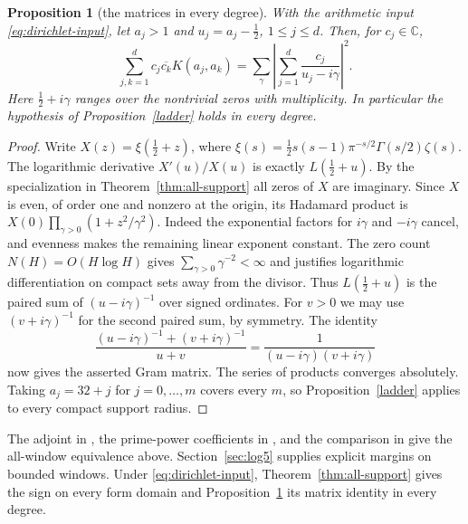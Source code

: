 \documentclass[11pt]{amsart}
\newtheorem{proposition}[theorem]{Proposition}
\theoremstyle{definition}
\theoremstyle{remark}
\begin{document}
\begin{proposition}[the matrices in every degree]\label{prop:all-degree-gram}
With the arithmetic input \eqref{eq:dirichlet-input}, let $a_j>1$
and $u_j=a_j-\tfrac12$, $1\le j\le d$. Then, for $c_j\in\mathbb C$,
\[
 \sum_{j,k=1}^d c_j\overline{c_k}K(a_j,a_k)
 =\sum_{\gamma}\left|\sum_{j=1}^d\frac{c_j}{u_j-i\gamma}\right|^2 .
\]
Here $\tfrac12+i\gamma$ ranges over the nontrivial zeros with multiplicity.
In particular the hypothesis of Proposition~\ref{ladder} holds in every degree.
\end{proposition}
\begin{proof}
Write $X(z)=\xi(\tfrac12+z)$, where
$\xi(s)=\tfrac12 s(s-1)\pi^{-s/2}\Gamma(s/2)\zeta(s)$.
The logarithmic derivative $X'(u)/X(u)$ is exactly $L(\tfrac12+u)$.
By the specialization in Theorem~\ref{thm:all-support} all zeros of $X$ are imaginary.
Since $X$ is even, of order one and nonzero at the origin, its Hadamard
product is $X(0)\prod_{\gamma>0}(1+z^2/\gamma^2)$.
Indeed the exponential factors for $i\gamma$ and $-i\gamma$ cancel,
and evenness makes the remaining linear exponent constant. The zero count
$N(H)=O(H\log H)$ gives $\sum_{\gamma>0}\gamma^{-2}<\infty$ and justifies
logarithmic differentiation on compact sets away from the divisor.
Thus $L(\tfrac12+u)$ is the paired sum of $(u-i\gamma)^{-1}$ over signed
ordinates. For $v>0$ we may use $(v+i\gamma)^{-1}$ for the second paired
sum, by symmetry. The identity
\[
 \frac{(u-i\gamma)^{-1}+(v+i\gamma)^{-1}}{u+v}
 =\frac1{(u-i\gamma)(v+i\gamma)}
\]
now gives the asserted Gram matrix. The series of products converges
absolutely. Taking $a_j=32+j$ for $j=0,\ldots,m$ covers every $m$, so
Proposition~\ref{ladder} applies to every compact support radius.
\end{proof}

The adjoint in \cite{P43}, the prime-power coefficients in
\cite{P44}, and the comparison in \cite[Theorem~C]{Paper45} give
the all-window equivalence above. Section~\ref{sec:log5} supplies
explicit margins on bounded windows. Under \eqref{eq:dirichlet-input},
Theorem~\ref{thm:all-support} gives the sign on every form domain and
Proposition~\ref{prop:all-degree-gram} its matrix identity in every degree.
\end{document}

